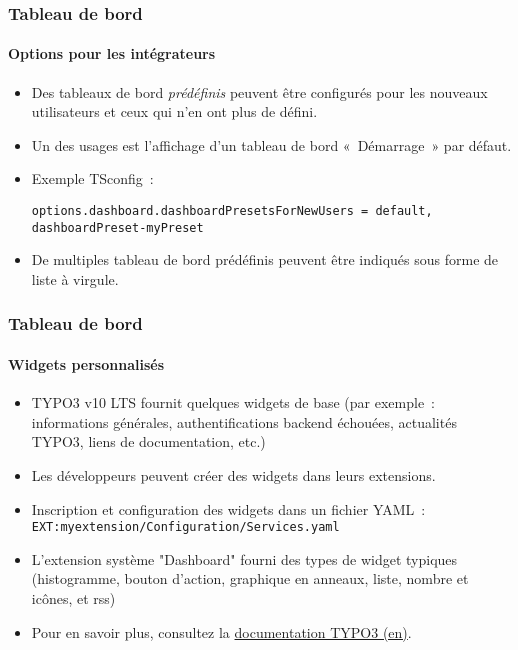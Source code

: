 
\begin{frame}[fragile]
	\frametitle{Tableau de bord}
	\framesubtitle{Options pour les intégrateurs}

	\lstset{basicstyle=\tiny\ttfamily}

	\begin{itemize}
		\item Des tableaux de bord \textit{prédéfinis} peuvent être configurés pour les nouveaux utilisateurs et ceux qui n'en ont plus de défini.
		\item Un des usages est l'affichage d'un tableau de bord «~Démarrage~» par défaut.
		\item Exemple TSconfig~:

\vspace{-0.4cm}
\begin{lstlisting}
options.dashboard.dashboardPresetsForNewUsers = default, dashboardPreset-myPreset
\end{lstlisting}

		\item De multiples tableau de bord prédéfinis peuvent être indiqués sous
		forme de liste à virgule.
	\end{itemize}

\end{frame}


\begin{frame}[fragile]
	\frametitle{Tableau de bord}
	\framesubtitle{Widgets personnalisés}

	\begin{itemize}
		\item TYPO3 v10 LTS fournit quelques widgets de base\newline
			\smaller
				(par exemple~: informations générales, authentifications backend échouées, actualités TYPO3,
				liens de documentation, etc.)
			\normalsize
		\item Les développeurs peuvent créer des widgets dans leurs extensions.
		\item Inscription et configuration des widgets dans un fichier YAML~:\newline
			\small
				\texttt{EXT:myextension/Configuration/Services.yaml}
			\normalsize
		\item L'extension système "Dashboard" fourni des types de widget typiques\newline
			\smaller
				(histogramme, bouton d'action, graphique en anneaux, liste, nombre et icônes, et rss)
			\normalsize
		\item Pour en savoir plus, consultez la
			\href{https://docs.typo3.org/c/typo3/cms-dashboard/master/en-us/}{documentation TYPO3 (en)}.

	\end{itemize}

\end{frame}

